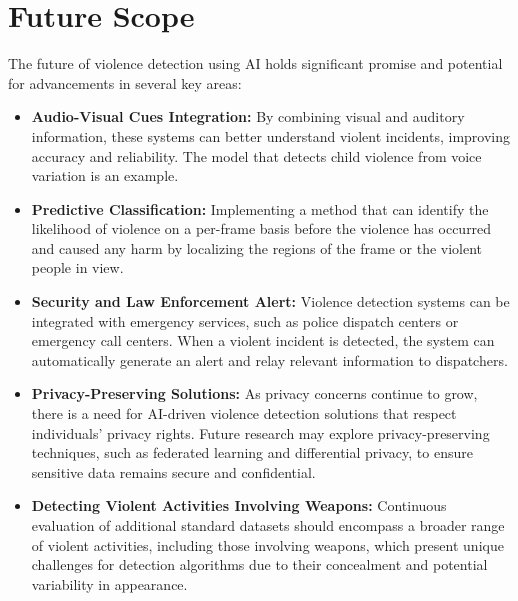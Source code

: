 
\section{Future Scope}

The future of violence detection using AI holds significant promise and potential for advancements in several key areas:

\begin{itemize}

    \item \textbf{Audio-Visual Cues Integration:} By combining visual and auditory information, these systems can better understand violent incidents, improving accuracy and reliability. The model that detects child violence from voice variation is an example.\cite{child_violence}

    \item \textbf{Predictive Classification:} Implementing a method that can identify the likelihood of violence on a per-frame basis before the violence has occurred and caused any harm by localizing the regions of the frame or the violent people in view.\cite{SepConvLSTM}

    \item \textbf{Security and Law Enforcement Alert:} Violence detection systems can be integrated with emergency services, such as police dispatch centers or emergency call centers. When a violent incident is detected, the system can automatically generate an alert and relay relevant information to dispatchers.

    \item \textbf{Privacy-Preserving Solutions:} As privacy concerns continue to grow, there is a need for AI-driven violence detection solutions that respect individuals' privacy rights. Future research may explore privacy-preserving techniques, such as federated learning\cite{Federated_Learn} and differential privacy, to ensure sensitive data remains secure and confidential.

\clearpage

    \item \textbf{Detecting Violent Activities Involving Weapons:} Continuous evaluation of additional standard datasets should encompass a broader range of violent activities, including those involving weapons\cite{lstm&bilstm}, which present unique challenges for detection algorithms due to their concealment and potential variability in appearance.


\end{itemize}
